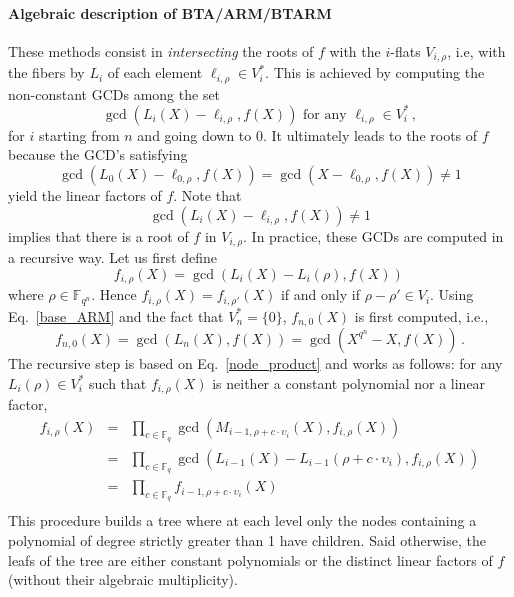 \documentclass{article}
\newcommand{\ff}[1]{\mathbb{F}_{#1}}
\newcommand{\qq}{q}
\newcommand{\nn}{n}
\newcommand{\qn}{{\qq^\nn}}
\newcommand{\basef}{\ff{\qq}}
\newcommand{\extf}{\ff{\qn}}
\begin{document}
\paragraph{Algebraic description of BTA/ARM/BTARM} These methods consist in \emph{intersecting} the roots of $f$ with the $i$-flats $V_{i,\rho}$, i.e, with the fibers by $L_i$ of each element $\ell_{i,\rho} \in V_i^\ast$.
This is achieved by computing the non-constant GCDs among the set
\begin{equation}
\label{base_ARM}
\gcd(L_i(X)-\ell_{i,\rho},f(X)) \mbox{ for any } \ell_{i,\rho} \in V_i^\ast\,,
\end{equation}
for $i$ starting from $n$ and going down to 0.
It ultimately leads to the roots of $f$ because the GCD's satisfying
$$\gcd(L_0(X)-\ell_{0,\rho},f(X))=\gcd(X-\ell_{0,\rho},f(X)) \ne 1$$
yield the linear factors of $f$.
Note that
\begin{equation}
\label{eq:duality-gcd}
\gcd(L_i(X)-\ell_{i,\rho},f(X)) \ne 1
\end{equation}
implies that there is a root of $f$ in $V_{i,\rho}$.
In practice, these GCDs are computed in a recursive way. Let us first define
$$f_{i,\rho}(X)=\gcd(L_i(X)-L_i(\rho),f(X))\,$$
where $\rho \in \extf$. Hence $f_{i,\rho}(X)=f_{i,\rho'}(X)$ if and only if $\rho-\rho' \in V_i$.
Using Eq.~\eqref{base_ARM} and the fact that $V_n^\ast=\{0\}$, $f_{n,0}(X)$ is first computed, i.e.,
$$f_{n,0}(X)=\gcd(L_n(X),f(X))=\gcd(X^{q^\nn}-X,f(X))\,.$$
The recursive step is based on Eq.~\eqref{node_product} and works as follows: for any $L_i(\rho) \in V_i^\ast$ such that $f_{i,\rho}(X)$ is neither a constant polynomial nor a linear factor,
$$
\begin{array}{lll}
f_{i,\rho}(X)&=&\prod_{c \in \basef} \gcd(M_{i-1,\rho+c \cdot \upsilon_i}(X),f_{i,\rho}(X)) \\
&=&\prod_{c \in \basef} \gcd(L_{i-1}(X)-L_{i-1}(\rho+c \cdot \upsilon_i),f_{i,\rho}(X)) \\
&=&\prod_{c \in \basef} f_{i-1,\rho+c \cdot \upsilon_i}(X)\\
\end{array}
$$
This procedure builds a tree where at each level only the nodes containing a polynomial of degree strictly greater than 1 have children. Said otherwise, the leafs of the tree are either constant polynomials or the distinct linear factors of $f$ (without their algebraic multiplicity).
\end{document}
